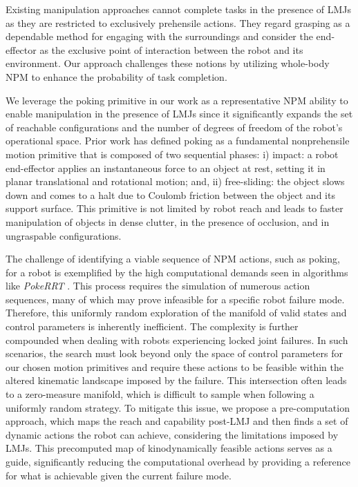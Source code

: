 Existing manipulation approaches cannot complete tasks in the presence of LMJs as they are restricted to exclusively prehensile actions. They regard grasping as a dependable method for engaging with the surroundings and consider the end-effector as the exclusive point of interaction between the robot and its environment.
Our approach challenges these notions by utilizing whole-body NPM to enhance the probability of task completion. 

We leverage the poking primitive in our work as a representative NPM ability to enable manipulation in the presence of LMJs since it significantly expands the set of reachable configurations and the number of degrees of freedom of the robot's operational space. Prior work has defined poking as a fundamental nonprehensile motion primitive
that is composed of two sequential phases: i) impact: a robot
end-effector applies an instantaneous force to an object at
rest, setting it in planar translational and rotational motion;
and, ii) free-sliding: the object slows down and comes to
a halt due to Coulomb friction between the object and its
support surface.  This primitive is not limited by robot
reach and leads to faster manipulation of objects in dense clutter, in the presence of occlusion, and in ungraspable configurations. \cite{pasricha2022pokerrt}

The challenge of identifying a viable sequence of NPM actions, such as poking, for a robot is exemplified by the high computational demands seen in algorithms like \textit{PokeRRT} \cite{pasricha2022pokerrt}. This process requires the simulation of numerous action sequences, many of which may prove infeasible for a specific robot failure mode. Therefore, this uniformly random exploration of the manifold of valid states and control parameters is inherently inefficient.
The complexity is further compounded when dealing with robots experiencing locked joint failures. In such scenarios, the search must look beyond only the space of control parameters for our chosen motion primitives and require these actions to be feasible within the altered kinematic landscape imposed by the failure. This intersection often leads to a zero-measure manifold, which is difficult to sample when following a uniformly random strategy.
To mitigate this issue, we propose a pre-computation approach, which maps the reach and capability post-LMJ and then finds a set of dynamic actions the robot can achieve, considering the limitations imposed by LMJs. This precomputed map of kinodynamically feasible actions serves as a guide, significantly reducing the computational overhead by providing a reference for what is achievable given the current failure mode.










